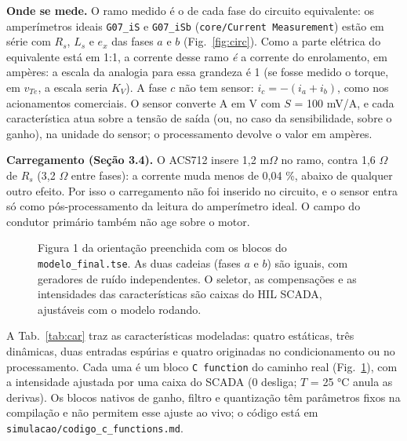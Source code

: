 \documentclass[10pt,a4paper]{article}
\newcommand{\R}[1]{\FloatBarrier\par\medskip\noindent{\large\bfseries #1}\par\smallskip}
\begin{document}
\textbf{Onde se mede.} O ramo medido é o de cada fase do circuito equivalente: os amperímetros ideais \texttt{G07\_iS} e \texttt{G07\_iSb} (\texttt{core/Current Measurement}) estão em série com $R_s$, $L_s$ e $e_x$ das fases $a$ e $b$ (Fig.~\ref{fig:circ}). Como a parte elétrica do equivalente está em 1:1, a corrente desse ramo \emph{é} a corrente do enrolamento, em ampères: a escala da analogia para essa grandeza é 1 (se fosse medido o torque, em $v_{Te}$, a escala seria $K_V$). A fase $c$ não tem sensor: $i_c = -(i_a + i_b)$, como nos acionamentos comerciais. O sensor converte A em V com $S$ = 100 mV/A, e cada característica atua sobre a tensão de saída (ou, no caso da sensibilidade, sobre o ganho), na unidade do sensor; o processamento devolve o valor em ampères.

\textbf{Carregamento (Seção 3.4).} O ACS712 insere 1,2 m$\Omega$ no ramo, contra 1,6 $\Omega$ de $R_s$ (3,2 $\Omega$ entre fases): a corrente muda menos de 0,04 \%, abaixo de qualquer outro efeito. Por isso o carregamento não foi inserido no circuito, e o sensor entra só como pós-processamento da leitura do amperímetro ideal. O campo do condutor primário também não age sobre o motor.

\begin{figure}[!p]\centering
\resizebox{\textwidth}{!}{}
\caption{Figura 1 da orientação preenchida com os blocos do \texttt{modelo\_final.tse}. As duas cadeias (fases $a$ e $b$) são iguais, com geradores de ruído independentes. O seletor, as compensações e as intensidades das características são caixas do HIL SCADA, ajustáveis com o modelo rodando.}\label{fig:f1}
\end{figure}

\R{3. Características do instrumento}
A Tab.~\ref{tab:car} traz as características modeladas: quatro estáticas, três dinâmicas, duas entradas espúrias e quatro originadas no condicionamento ou no processamento. Cada uma é um bloco \texttt{C function} do caminho real (Fig.~\ref{fig:f1}), com a intensidade ajustada por uma caixa do SCADA (0 desliga; $T$ = 25 °C anula as derivas). Os blocos nativos de ganho, filtro e quantização têm parâmetros fixos na compilação e não permitem esse ajuste ao vivo; o código está em \texttt{simulacao/codigo\_c\_functions.md}.
\end{document}
